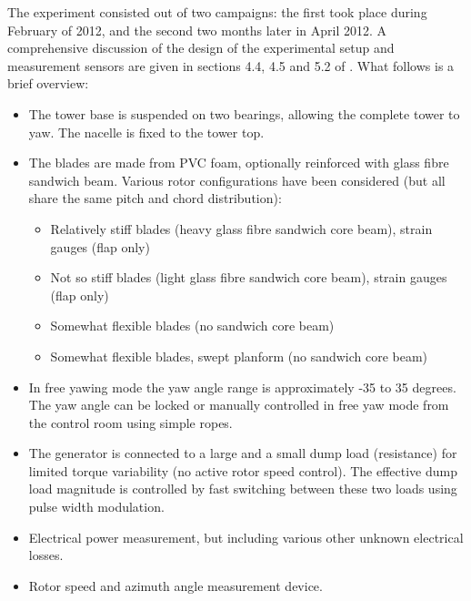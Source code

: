 \documentclass[a4paper]{jpconf}
\begin{document}

The experiment consisted out of two campaigns: the first took place during February of 2012, and the second two months later in April 2012. A comprehensive discussion of the design of the experimental setup and measurement sensors are given in sections 4.4, 4.5 and 5.2 of \cite{verelst_numerical_2013:diss}. What follows is a brief overview:

\begin{itemize}
	\item The tower base is suspended on two bearings, allowing the complete tower to yaw. The nacelle is fixed to the tower top.
	\item The blades are made from PVC foam, optionally reinforced with glass fibre sandwich beam. Various rotor configurations have been considered (but all share the same pitch and chord distribution):
	\begin{itemize}
		\item Relatively stiff blades (heavy glass fibre sandwich core beam), strain gauges (flap only)
		\item Not so stiff blades (light glass fibre sandwich core beam), strain gauges (flap only)
		\item Somewhat flexible blades (no sandwich core beam)
		\item Somewhat flexible blades, swept planform (no sandwich core beam)
	\end{itemize}
	\item In free yawing mode the yaw angle range is approximately -35 to 35 degrees. The yaw angle can be locked or manually controlled in free yaw mode from the control room using simple ropes.
	\item The generator is connected to a large and a small dump load (resistance) for limited torque variability (no active rotor speed control). The effective dump load magnitude is controlled by fast switching between these two loads using pulse width modulation.
	\item Electrical power measurement, but including various other unknown electrical losses.
	\item Rotor speed and azimuth angle measurement device.

\end{itemize}
\end{document}
